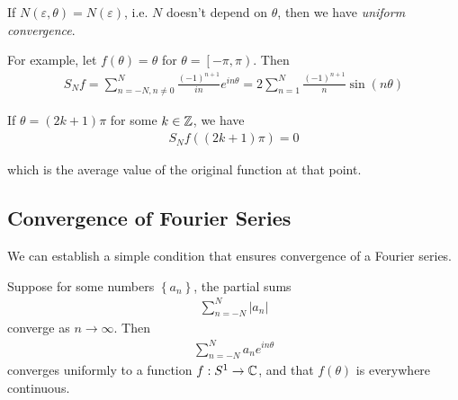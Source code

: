 \documentclass[a4paper]{article}
\begin{document}
If $N\left(\varepsilon,\theta\right) = N\left(\varepsilon\right)$, i.e. $N$ doesn't depend on $\theta$, then we have \emph{uniform convergence}.

For example, let $f\left(\theta\right) = \theta$ for $\theta = \left[-\pi,\pi\right)$. Then
\begin{equation*}
\begin{aligned}
S_N f = \sum_{n=-N, n\neq 0}^N \frac{\left(-1\right)^{n+1}}{in} e^{in\theta} = 2 \sum_{n=1}^N \frac{\left(-1\right)^{n+1}}{n} \sin\left(n\theta\right)
\end{aligned}
\end{equation*}

If $\theta = \left(2k+1\right) \pi$ for some $k\in\mathbb{Z}$, we have
\begin{equation*}
\begin{aligned}
S_N f\left(\left(2k+1\right)\pi\right) = 0
\end{aligned}
\end{equation*}

which is the average value of the original function at that point.

\subsection{Convergence of Fourier Series}
We can establish a simple condition that ensures convergence of a Fourier series.

Suppose for some numbers $\left\{a_n\right\}$, the partial sums
\begin{equation*}
\begin{aligned}
\sum_{n = -N}^N |a_n|
\end{aligned}
\end{equation*}
converge as $n \to \infty$. Then
\begin{equation*}
\begin{aligned}
\sum_{n=-N}^N a_n e^{in\theta}
\end{aligned}
\end{equation*}
converges uniformly to a function $f: S^1 \to \mathbb{C}$, and that $f\left(\theta\right)$ is everywhere continuous.
\end{document}
